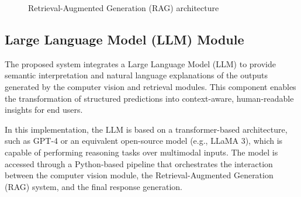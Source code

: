 \documentclass[11pt]{article}
\begin{document}
\begin{figure}[h]
\centering
{}
\caption{Retrieval-Augmented Generation (RAG) architecture}
\label{fig:rag}
\end{figure}

\subsection{Large Language Model (LLM) Module}
The proposed system integrates a Large Language Model (LLM) to provide semantic interpretation and natural language explanations of the outputs generated by the computer vision and retrieval modules. This component enables the transformation of structured predictions into context-aware, human-readable insights for end users.

In this implementation, the LLM is based on a transformer-based architecture, such as GPT-4 or an equivalent open-source model (e.g., LLaMA 3), which is capable of performing reasoning tasks over multimodal inputs. The model is accessed through a Python-based pipeline that orchestrates the interaction between the computer vision module, the Retrieval-Augmented Generation (RAG) system, and the final response generation.
\end{document}
